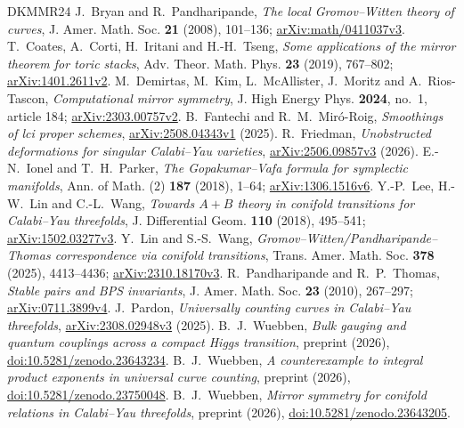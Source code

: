 \begin{thebibliography}{DKMMR24}
 J.~Bryan and R.~Pandharipande,
\emph{The local Gromov--Witten theory of curves},
J. Amer. Math. Soc. \textbf{21} (2008), 101--136;
\href{https://arxiv.org/abs/math/0411037v3}{arXiv:math/0411037v3}.
 T.~Coates, A.~Corti, H.~Iritani and H.-H.~Tseng,
\emph{Some applications of the mirror theorem for toric stacks},
Adv. Theor. Math. Phys. \textbf{23} (2019), 767--802;
\href{https://arxiv.org/abs/1401.2611v2}{arXiv:1401.2611v2}.
 M.~Demirtas, M.~Kim, L.~McAllister, J.~Moritz
and A.~Rios-Tascon, \emph{Computational mirror symmetry},
J. High Energy Phys. \textbf{2024}, no.~1, article 184;
\href{https://arxiv.org/abs/2303.00757v2}{arXiv:2303.00757v2}.
 B.~Fantechi and R.~M.~Mir\'o-Roig,
\emph{Smoothings of lci proper schemes},
\href{https://arxiv.org/abs/2508.04343v1}{arXiv:2508.04343v1} (2025).
 R.~Friedman,
\emph{Unobstructed deformations for singular Calabi--Yau varieties},
\href{https://arxiv.org/abs/2506.09857v3}{arXiv:2506.09857v3} (2026).
 E.-N.~Ionel and T.~H.~Parker,
\emph{The Gopakumar--Vafa formula for symplectic manifolds},
Ann. of Math. (2) \textbf{187} (2018), 1--64;
\href{https://arxiv.org/abs/1306.1516v6}{arXiv:1306.1516v6}.
 Y.-P.~Lee, H.-W.~Lin and C.-L.~Wang,
\emph{Towards $A+B$ theory in conifold transitions for Calabi--Yau threefolds},
J. Differential Geom. \textbf{110} (2018), 495--541;
\href{https://arxiv.org/abs/1502.03277v3}{arXiv:1502.03277v3}.
 Y.~Lin and S.-S.~Wang,
\emph{Gromov--Witten/Pandharipande--Thomas correspondence via conifold transitions},
Trans. Amer. Math. Soc. \textbf{378} (2025), 4413--4436;
\href{https://arxiv.org/abs/2310.18170v3}{arXiv:2310.18170v3}.
 R.~Pandharipande and R.~P.~Thomas,
\emph{Stable pairs and BPS invariants}, J. Amer. Math. Soc.
\textbf{23} (2010), 267--297;
\href{https://arxiv.org/abs/0711.3899v4}{arXiv:0711.3899v4}.
 J.~Pardon,
\emph{Universally counting curves in Calabi--Yau threefolds},
\href{https://arxiv.org/abs/2308.02948v3}{arXiv:2308.02948v3} (2025).
 B.~J.~Wuebben,
\emph{Bulk gauging and quantum couplings across a compact Higgs transition},
preprint (2026),
\href{https://doi.org/10.5281/zenodo.23643234}{doi:10.5281/\allowbreak zenodo.23643234}.
 B.~J.~Wuebben,
\emph{A counterexample to integral product exponents in universal curve counting},
preprint (2026),
\href{https://doi.org/10.5281/zenodo.23750048}{doi:10.5281/\allowbreak zenodo.23750048}.
 B.~J.~Wuebben,
\emph{Mirror symmetry for conifold relations in Calabi--Yau threefolds},
preprint (2026),
\href{https://doi.org/10.5281/zenodo.23643205}{doi:10.5281/\allowbreak zenodo.23643205}.
\end{thebibliography}

